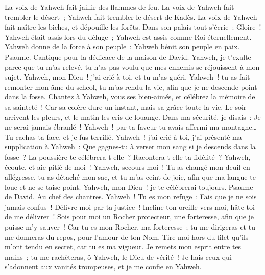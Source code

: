 \begin{multicols}{2}
La voix de Yahweh fait jaillir des flammes de feu.
La voix de Yahweh fait trembler le désert~; Yahweh fait trembler le désert de Kadès.
La voix de Yahweh fait naître les biches, et dépouille les forêts. Dans son palais tout s'écrie~: Gloire~!
Yahweh était assis lors du déluge~; Yahweh est assis comme Roi éternellement.
Yahweh donne de la force à son peuple~; Yahweh bénit son peuple en paix.
\VerseOne{}Psaume. Cantique pour la dédicace de la maison de David.
Yahweh, je t'exalte parce que tu m'as relevé, tu n'as pas voulu que mes ennemis se réjouissent à mon sujet.
Yahweh, mon Dieu~! j'ai crié à toi, et tu m'as guéri.
Yahweh~! tu as fait remonter mon âme du scheol, tu m'as rendu la vie, afin que je ne descende point dans la fosse.
Chantez à Yahweh, vous ses bien-aimés, et célébrez la mémoire de sa sainteté~!
Car sa colère dure un instant, mais sa grâce toute la vie. Le soir arrivent les pleurs, et le matin les cris de louange.
Dans ma sécurité, je disais~: Je ne serai jamais ébranlé~!
Yahweh~! par ta faveur tu avais affermi ma montagne… Tu cachas ta face, et je fus terrifié.
Yahweh~! j'ai crié à toi, j'ai présenté ma supplication à Yahweh~:
Que gagnes-tu à verser mon sang si je descends dans la fosse~? La poussière te célébrera-t-elle~? Racontera-t-elle ta fidélité~?
Yahweh, écoute, et aie pitié de moi~! Yahweh, secours-moi~!
Tu as changé mon deuil en allégresse, tu as détaché mon sac, et tu m'as ceint de joie,
afin que ma langue te loue et ne se taise point. Yahweh, mon Dieu~! je te célébrerai toujours.
\VerseOne{}Psaume de David. Au chef des chantres.
Yahweh~! Tu es mon refuge~: Fais que je ne sois jamais confus~! Délivre-moi par ta justice~!
Incline ton oreille vers moi, hâte-toi de me délivrer~! Sois pour moi un Rocher protecteur, une forteresse, afin que je puisse m'y sauver~!
Car tu es mon Rocher, ma forteresse~; tu me dirigeras et tu me donneras du repos, pour l'amour de ton Nom.
Tire-moi hors du filet qu'ils m'ont tendu en secret, car tu es ma vigueur.
Je remets mon esprit entre tes mains~; tu me rachèteras, ô Yahweh, le Dieu de vérité~!
Je hais ceux qui s'adonnent aux vanités trompeuses, et je me confie en Yahweh.

\end{multicols}

